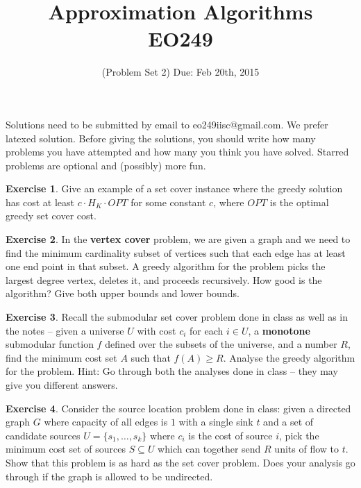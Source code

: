 \documentclass[11pt]{article}
\theoremstyle{definition}
\newtheorem{exercise}{Exercise}
\begin{document}
\title{{\bf Approximation Algorithms} \\ 
{\normalsize EO249}}
\date{(Problem Set 2) Due: Feb 20th, 2015}
\maketitle
{\small 
Solutions need to be submitted by email to eo249iisc@gmail.com. We prefer latexed solution. 
Before giving the solutions, you should write how many problems you have attempted and how many you think you have solved.
Starred problems are optional and (possibly) more fun.
}
\vspace{1ex}

\begin{exercise}
Give an example of a set cover instance where the greedy solution has cost at least  $c\cdot H_K\cdot OPT$ for some constant $c$, where $OPT$ is the optimal greedy set cover cost.
\end{exercise}
\vspace{1ex}

\begin{exercise}
In the {\bf vertex cover} problem, we are given a graph and we need to find the minimum cardinality subset of vertices such that each edge has 
at least one end point in that subset. A greedy algorithm for the problem picks the largest degree vertex, deletes it, and proceeds recursively.
How good is the algorithm? Give both upper bounds and lower bounds.
\end{exercise}
\vspace{1ex}

\begin{exercise}
Recall the submodular set cover problem done in class as well as in the notes -- given a universe $U$ with cost $c_i$ for each $i\in U$, a {\bf monotone} submodular function $f$ defined over the subsets of the universe, and a number $R$, find the minimum cost set $A$ such that $f(A) \geq R$. Analyse the greedy algorithm for the problem. Hint: Go through both the analyses done in class -- they may give you different answers.
\end{exercise}
\vspace{1ex}

\begin{exercise}
Consider the source location problem done in class: given a directed graph $G$ where capacity of all edges is $1$ with a single sink $t$ and a set of candidate sources $U = \{s_1,\ldots,s_k\}$ where $c_i$ is the cost of source $i$, pick the minimum cost set of sources $S\subseteq U$ which can together send $R$ units of flow to $t$.
Show that this problem is as hard as the set cover problem. Does your analysis go through if the graph is allowed to be undirected.
\end{exercise}
\vspace{1ex}
\end{document}
